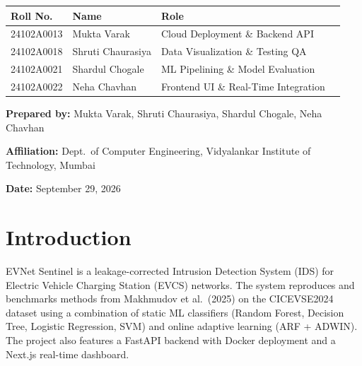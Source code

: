 \documentclass[11pt, a4paper]{article}
\begin{document}
\begin{titlepage}
\vspace{1.0cm}

\begin{tcolorbox}[colback=lightgray, colframe=darkbg, width=0.82\textwidth, rounded corners, title={\textbf{Team Members}}]
\centering
\begin{tabular}{llll}
\textbf{Roll No.} & \textbf{Name} & \textbf{Role} \\
\midrule
24102A0013 & Mukta Varak & Cloud Deployment \& Backend API \\
24102A0018 & Shruti Chaurasiya & Data Visualization \& Testing QA \\
24102A0021 & Shardul Chogale & ML Pipelining \& Model Evaluation \\
24102A0022 & Neha Chavhan & Frontend UI \& Real-Time Integration \\
\end{tabular}
\end{tcolorbox}

\vfill
{\large\textbf{Prepared by:} Mukta Varak, Shruti Chaurasiya, Shardul Chogale, Neha Chavhan}\par
\vspace{0.2cm}
{\large\textbf{Affiliation:} Dept.\ of Computer Engineering, Vidyalankar Institute of Technology, Mumbai}\par
\vspace{0.2cm}
{\large\textbf{Date:} September 29, 2026}\par
\end{titlepage}

\tableofcontents
\newpage

\section{Introduction}
\label{sec:intro}

EVNet Sentinel is a leakage-corrected Intrusion Detection System (IDS) for Electric Vehicle Charging Station (EVCS) networks. The system reproduces and benchmarks methods from Makhmudov et al.\ (2025) on the CICEVSE2024 dataset using a combination of static ML classifiers (Random Forest, Decision Tree, Logistic Regression, SVM) and online adaptive learning (ARF + ADWIN). The project also features a FastAPI backend with Docker deployment and a Next.js real-time dashboard.
\end{document}
